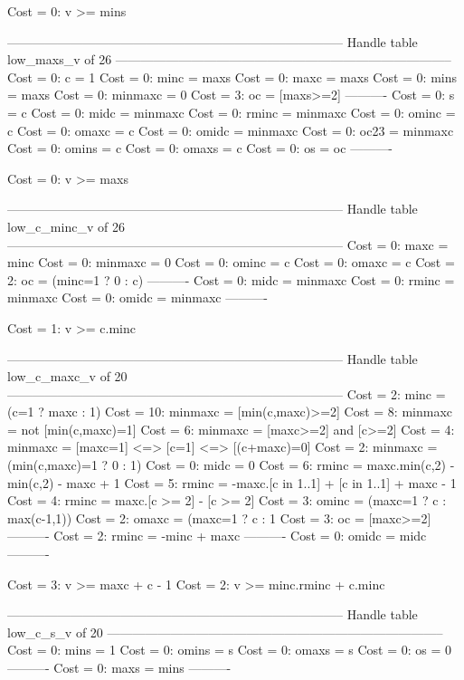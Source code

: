 Cost =  0:  v >= mins

--------------------------------------------------------------------------------
Handle table low_maxs_v of 26
--------------------------------------------------------------------------------
Cost =  0:  c       = 1
Cost =  0:  minc    = maxs
Cost =  0:  maxc    = maxs
Cost =  0:  mins    = maxs
Cost =  0:  minmaxc = 0
Cost =  3:  oc      = [maxs>=2]
----------
Cost =  0:  s       = c
Cost =  0:  midc    = minmaxc
Cost =  0:  rminc   = minmaxc
Cost =  0:  ominc   = c
Cost =  0:  omaxc   = c
Cost =  0:  omidc   = minmaxc
Cost =  0:  oc23    = minmaxc
Cost =  0:  omins   = c
Cost =  0:  omaxs   = c
Cost =  0:  os      = oc
----------

Cost =  0:  v >= maxs

--------------------------------------------------------------------------------
Handle table low_c_minc_v of 26
--------------------------------------------------------------------------------
Cost =  0:  maxc    = minc
Cost =  0:  minmaxc = 0
Cost =  0:  ominc   = c
Cost =  0:  omaxc   = c
Cost =  2:  oc      = (minc=1 ? 0 : c)
----------
Cost =  0:  midc    = minmaxc
Cost =  0:  rminc   = minmaxc
Cost =  0:  omidc   = minmaxc
----------

Cost =  1:  v >= c.minc

--------------------------------------------------------------------------------
Handle table low_c_maxc_v of 20
--------------------------------------------------------------------------------
Cost =  2:  minc    = (c=1 ? maxc : 1)
Cost = 10:  minmaxc = [min(c,maxc)>=2]
Cost =  8:  minmaxc = not [min(c,maxc)=1]
Cost =  6:  minmaxc = [maxc>=2] and [c>=2]
Cost =  4:  minmaxc = [maxc=1] <=> [c=1] <=> [(c+maxc)=0]
Cost =  2:  minmaxc = (min(c,maxc)=1 ? 0 : 1)
Cost =  0:  midc    = 0
Cost =  6:  rminc   = maxc.min(c,2) - min(c,2) - maxc + 1
Cost =  5:  rminc   = -maxc.[c in 1..1] + [c in 1..1] + maxc - 1
Cost =  4:  rminc   = maxc.[c >= 2] - [c >= 2]
Cost =  3:  ominc   = (maxc=1 ? c : max(c-1,1))
Cost =  2:  omaxc   = (maxc=1 ? c : 1
Cost =  3:  oc      = [maxc>=2]
----------
Cost =  2:  rminc   = -minc + maxc
----------
Cost =  0:  omidc   = midc
----------

Cost =  3:  v >= maxc + c - 1
Cost =  2:  v >= minc.rminc + c.minc

--------------------------------------------------------------------------------
Handle table low_c_s_v of 20
--------------------------------------------------------------------------------
Cost =  0:  mins  = 1
Cost =  0:  omins = s
Cost =  0:  omaxs = s
Cost =  0:  os    = 0
----------
Cost =  0:  maxs  = mins
----------

